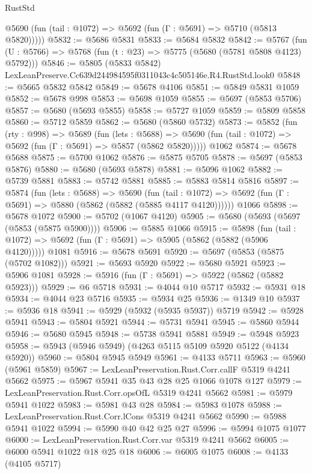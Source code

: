 \begin{lexlean}{RustStd}
\begin{coremodule}
      @5690 (fun (tail : @1072) => @5692 (fun (Γ : @5691) => @5710 (@5813 @5820)))))
@5832 := @5686 @5831
@5833 := @5684 @5832
@5842 := @5767 (fun (U : @5766) => @5768 (fun (t : @23) => @5775 (@5680 (@5781 @5808 @4123) @5792)))
@5846 := @5805 (@5833 @5842) LexLeanPreserve.Cc639d244984595f0311043c4c505146e.R4.RustStd.look0
@5848 := @5665 @5832 @5842
@5849 := @5678 @4106
@5851 := @5849 @5831 @1059
@5852 := @5678 @998
@5853 := @5698 @1059
@5855 := @5697 (@5853 @5706)
@5857 := @5680 (@5693 @5855)
@5858 := @5727 @1059
@5859 := @5809 @5858
@5860 := @5712 @5859
@5862 := @5680 (@5860 @5732)
@5873 := @5852
    (fun (rty : @998) =>
    @5689
      (fun (lets : @5688) =>
      @5690 (fun (tail : @1072) => @5692 (fun (Γ : @5691) => @5857 (@5862 @5820)))))
    @1062
@5874 := @5678 @5688
@5875 := @5700 @1062
@5876 := @5875 @5705
@5878 := @5697 (@5853 @5876)
@5880 := @5680 (@5693 @5878)
@5881 := @5096 @1062
@5882 := @5739 @5881
@5883 := @5742 @5881
@5885 := @5883 @5814 @5816
@5897 := @5874
    (fun (lets : @5688) =>
    @5690
      (fun (tail : @1072) => @5692 (fun (Γ : @5691) => @5880 (@5862 (@5882 (@5885 @4117 @4120))))))
    @1066
@5898 := @5678 @1072
@5900 := @5702 (@1067 @4120)
@5905 := @5680 (@5693 (@5697 (@5853 (@5875 @5900))))
@5906 := @5885 @1066
@5915 := @5898
    (fun (tail : @1072) => @5692 (fun (Γ : @5691) => @5905 (@5862 (@5882 (@5906 @4120)))))
    @1081
@5916 := @5678 @5691
@5920 := @5697 (@5853 (@5875 (@5702 @1082)))
@5921 := @5693 @5920
@5922 := @5680 @5921
@5923 := @5906 @1081
@5928 := @5916 (fun (Γ : @5691) => @5922 (@5862 (@5882 @5923)))
@5929 := @6 @5718
@5931 := @4044 @10 @5717
@5932 := @5931 @18
@5934 := @4044 @23 @5716
@5935 := @5934 @25
@5936 := @1349 @10
@5937 := @5936 @18
@5941 := @5929 (@5932 (@5935 @5937)) @5719
@5942 := @5928 @5941
@5943 := @5804 @5921
@5944 := @5731 @5941
@5945 := @5860 @5944
@5946 := @5680 @5945
@5948 := @5738 @5941 @5881
@5949 := @5948 @5923
@5958 := @5943 (@5946 @5949) (@4263 @5115 @5109 @5920 @5122 (@4134 @5920))
@5960 := @5804 @5945 @5949
@5961 := @4133 @5711
@5963 := @5960 (@5961 @5859)
@5967 := LexLeanPreservation.Rust.Corr.callF @5319 @4241 @5662
@5975 := @5967 @5941 @35 @43 @28 @25 @1066 @1078 @127
@5979 := LexLeanPreservation.Rust.Corr.opsOfL @5319 @4241 @5662
@5981 := @5979 @5941 @1022
@5983 := @5981 @43 @28
@5984 := @5983 @1078
@5988 := LexLeanPreservation.Rust.Corr.lCons @5319 @4241 @5662
@5990 := @5988 @5941 @1022
@5994 := @5990 @40 @42 @25 @27
@5996 := @5994 @1075 @1077
@6000 := LexLeanPreservation.Rust.Corr.var @5319 @4241 @5662
@6005 := @6000 @5941 @1022 @18 @25 @18
@6006 := @6005 @1075
@6008 := @4133 (@4105 @5717)

\end{coremodule}
\end{lexlean}

